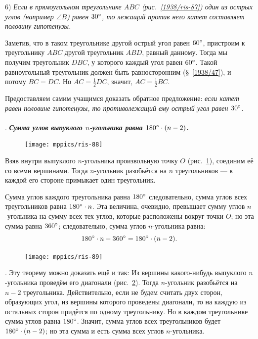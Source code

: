 \documentclass[oneside]{book}
\begin{document}
6) \emph{Если в прямоугольном треугольнике $ABC$ \emph{(рис.~\ref{1938/ris-87})} один из острых углов \emph{(например $\angle B$)} равен $30\degree$, то лежащий против него катет составляет половину гипотенузы.}

Заметив, что в таком треугольнике другой острый угол равен $60\degree$, пристроим к треугольнику $ABC$ другой треугольник $ABD$, равный данному.
Тогда мы получим треугольник $DBC$, у которого каждый угол равен $60\degree$.
Такой равноугольный треугольник должен быть равносторонним (§~\ref{1938/47}), и потому $BC=DC$.
Но $AC=\tfrac12DC$, значит, $AC=\tfrac12BC$.

Предоставляем самим учащимся доказать обратное предложение:
\emph{если катет равен половине гипотенузы, то противолежащий ему острый угол равен $30\degree$.}

\paragraph{}\label{1938/82}
.
\textbf{\emph{Сумма углов выпуклого $n$-угольника равна $180\degree\cdot(n-2)$.}}

\begin{figure}
\centering
\texttt{[image: mppics/ris-88]}
\caption{}\label{1938/ris-88}
\end{figure}

Взяв внутри выпуклого $n$-угольника произвольную точку $O$ (рис.~\ref{1938/ris-88}), соединим её со всеми вершинами.
Тогда $n$-угольник разобьётся на $n$ треугольников — к каждой его стороне примыкает один треугольник.

Сумма углов каждого треугольника равна $180\degree$ следовательно, сумма углов всех треугольников равна $180\degree\cdot n$.
Эта величина, очевидно, превышает сумму углов $n$-угольника на сумму всех тех углов, которые расположены вокруг точки $O$;
но эта сумма равна $360\degree$;
следовательно, сумма углов $n$-угольника равна:
\[180\degree\cdot n -360\degree = 180\degree\cdot(n - 2).\]

\begin{figure}
\centering
\texttt{[image: mppics/ris-89]}
\caption{}\label{1938/ris-89}
\end{figure}


\smallskip
\mbox{.}
Эту теорему можно доказать ещё и так:
Из вершины какого-нибудь выпуклого $n$-угольника проведём его диагонали (рис.~\ref{1938/ris-89}).
Тогда $n$-угольник разобьётся на $n-2$ треугольника.
Действительно, если не будем считать двух сторон, образующих угол, из вершины которого проведены диагонали, то на каждую из остальных сторон придётся по одному треугольнику.
Но в каждом треугольнике сумма углов равна $180\degree$.
Значит, сумма углов всех треугольников будет $180\degree\cdot(n-2)$;
но эта сумма и есть сумма всех углов $n$-угольника.
\end{document}
